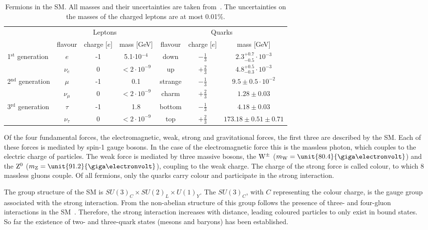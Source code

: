 \begin{table}
\centering
 \renewcommand{\arraystretch}{1.3}
\caption{Fermions in the SM. All masses and their uncertainties are taken from~\cite{PDG}. The uncertainties on the masses of the charged leptons are at most 0.01\%.}
\label{tab:fermions}
\begin{tabular}{l|c c c | c c c }
  & \multicolumn{3}{c|}{Leptons} & \multicolumn{3}{c}{Quarks} \\
    & flavour & charge [$e$] & mass [GeV] & flavour & charge [$e$] & mass [GeV] \\
    \hline
  \multirow{2}{*}{1$^{\mathrm{st}}$ generation} & $e$ & -1 & 5.1$\cdot$10$^{\mathrm{-4}}$ &  down & $-\frac{1}{3}$ & $2.3^{+0.7}_{-0.5}\cdot10^{-3}$ \\
 												& $\nu_e$ & 0 & $<2\cdot10^{-9}$ &  up & $+\frac{2}{3}$ & $4.8^{+0.5}_{-0.3}\cdot10^{-3}$  \\
 												\hline
  \multirow{2}{*}{2$^{\mathrm{nd}}$ generation} & $\mu$ & -1  & 0.1 & strange & $-\frac{1}{3}$ & $9.5\pm0.5\cdot10^{-2}$ \\
 												& $\nu_{\mu}$ & 0 & $<2\cdot10^{-9}$ & charm & $+\frac{2}{3}$ & $1.28\pm0.03$ \\
 												\hline
  \multirow{2}{*}{3$^{\mathrm{rd}}$ generation} & $\tau$ & -1 & 1.8 & bottom & $-\frac{1}{3}$ & $4.18\pm0.03$\\
 												& $\nu_{\tau}$ & 0 & $<2\cdot10^{-9}$ & top & $+\frac{2}{3}$ & $173.18\pm0.51\pm0.71$ \\ 												
 
 
\end{tabular}

\end{table}

Of the four fundamental forces, the electromagnetic, weak, strong and gravitational forces, the first three are described by the SM. Each of these forces is mediated by spin-1 gauge bosons. In the case of the electromagnetic force this is the massless photon, which couples to the electric charge of particles. The weak force is mediated by three massive bosons, the $\mathrm{W}^{\pm}$ ($m_{\W} = \unit{80.4}{\giga\electronvolt}$) and the $\mathrm{Z}^{0}$ ($m_{\mathrm{Z}} = \unit{91.2}{\giga\electronvolt}$), coupling to the weak charge. The charge of the strong force is called colour, to which 8 massless gluons couple. Of all fermions, only the quarks carry colour and participate in the strong interaction. 

The group structure of the SM is $SU(3)_C \times SU(2)_L \times U(1)_Y$. The $SU(3)_C$, with $C$ representing the colour charge, is the gauge group associated with the strong interaction. From the non-abelian structure of this group follows the presence of three- and four-gluon interactions in the SM~\cite{Pich:2007vu}. Therefore, the strong interaction increases with distance, leading coloured particles to only exist in bound states. So far the existence of two- and three-quark states (mesons and baryons) has been established. 


